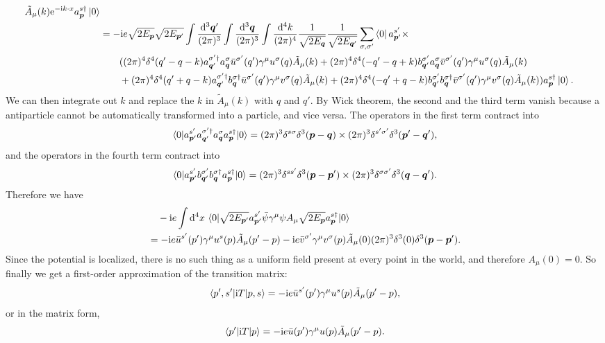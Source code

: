 \documentclass[hyperref, a4paper]{article}
\newcommand*{\ii}{\mathrm{i}}
\newcommand*{\ee}{\mathrm{e}}
\begin{document}
\begin{itemize}
\[\begin{aligned}
        \tilde{A}_\mu(k) \ee^{- \ii k \cdot x} a^{s \dagger}_{\vb*{p}} \ket{0} \\
        &= - \ii e \sqrt{2 E_{\vb*{p}}} \sqrt{2 E_{\vb*{p}'}} \int \frac{\dd[3]{\vb*{q}'}}{(2\pi)^3} \int \frac{\dd[3]{\vb*{q}}}{(2\pi)^3} \int \frac{\dd[4]{k}}{(2\pi)^4} \frac{1}{\sqrt{2 E_{\vb*{q}}}} \frac{1}{\sqrt{2 E_{\vb*{q}'}}} \sum_{\sigma, \sigma'} \bra{0} a^{s'}_{\vb*{p}'} \times \\
        & \quad \quad ( (2\pi)^4 \delta^4(q'-q-k) a^{\sigma' \dagger}_{\vb*{q}'} a^\sigma_{\vb*{q}} \bar{u}^{\sigma'}(q') \gamma^\mu u^\sigma(q) \tilde{A}_\mu(k) + (2\pi)^4 \delta^4(-q' - q +k) b^{\sigma'}_{\vb*{q}'} a^\sigma_{\vb*{q}} \bar{v}^{\sigma'}(q') \gamma^\mu u^\sigma(q) \tilde{A}_\mu (k) \\
        &\quad \quad + (2\pi)^4 \delta^4(q' + q - k) a^{\sigma' \dagger}_{\vb*{q}'} b^{\sigma \dagger}_{\vb*{q}} \bar{u}^{\sigma'}(q') \gamma^\mu v^\sigma(q) \tilde{A}_\mu(k) + 
        (2\pi)^4 \delta^4(-q' + q - k) b^{\sigma'}_{\vb*{q}'} b^{\sigma \dagger}_{\vb*{q}} \bar{v}^{\sigma'}(q') \gamma^\mu v^\sigma(q) \tilde{A}_\mu(k) ) a^{s \dagger}_{\vb*{p}} \ket*{0}.
    \end{aligned}
\]
We can then integrate out $k$ and replace the $k$ in $\tilde{A}_\mu(k)$ with $q$ and $q'$.
By Wick theorem, the second and the third term vanish because a antiparticle cannot be automatically transformed
into a particle, and vice versa. The operators in the first term contract into 
\[
    \mel{0}{a^{s'}_{\vb*{p}'} a^{\sigma' \dagger}_{\vb*{q}'} a^\sigma_{\vb*{q}} a^{s \dagger}_{\vb*{p}} }{0} = (2\pi)^3 \delta^{s \sigma} \delta^3(\vb*{p} - \vb*{q}) \times (2\pi)^3 \delta^{s' \sigma'} \delta^3(\vb*{p}' - \vb*{q}'),
\]
and the operators in the fourth term contract into 
\[
    \mel{0}{a^{s'}_{\vb*{p}'} b^{\sigma'}_{\vb*{q}'} b^{\sigma \dagger}_{\vb*{q}} a^{s \dagger}_{\vb*{p}} }{0} = (2\pi)^3 \delta^{s s'} \delta^3(\vb*{p} - \vb*{p}') \times (2\pi)^3 \delta^{\sigma \sigma'} \delta^3(\vb*{q} - \vb*{q}').
\]
Therefore we have
\[
    \begin{aligned}
        &\quad - \ii e \int \dd[4]{x} \mel{0}{ \sqrt{2 E_{\vb*{p}'}} a_{\vb*{p}'}^{s'} \bar{\psi} \gamma^{\mu} \psi A_{\mu} \sqrt{2 E_{\vb*{p}}} a^{s\dagger}_{\vb*{p}} }{0} \\
        &= - \ii e \bar{u}^{s'}(p') \gamma^\mu u^s(p) \tilde{A}_\mu(p' - p) - \ii e \bar{v}^{\sigma'} \gamma^\mu v^\sigma(p) \tilde{A}_\mu(0) (2\pi)^3 \delta^3(0) \delta^3(\vb*{p} - \vb*{p}'). 
    \end{aligned}
\]
Since the potential is localized, there is no such thing as a uniform field present at every point in the world, 
and therefore $A_\mu(0) = 0$. So finally we get a first-order approximation of the transition matrix:
\begin{equation}
    \mel{p', s'}{\ii T}{p, s} = - \ii e \bar{u}^{s'}(p') \gamma^\mu u^s(p) \tilde{A}_\mu(p' - p) ,
\end{equation}
or in the matrix form, 
\begin{equation}
    \mel{p'}{\ii T}{p} = - \ii e \bar{u}(p') \gamma^\mu u(p) \tilde{A}_\mu(p' - p).
\end{equation}


\end{itemize}
\end{document}
